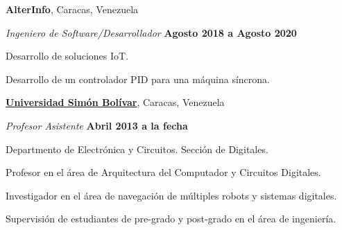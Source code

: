 \documentclass[10pt]{article}
\begin{document}
\textbf{AlterInfo}, Caracas, Venezuela
\begin{outerlist}
    \item[] \textit{Ingeniero de Software/Desarrollador}%
            \hfill \textbf{Agosto 2018 a Agosto 2020}
            \begin{innerlist}
                \item Desarrollo de soluciones IoT.
                \item Desarrollo de un controlador PID para una máquina síncrona.
            \end{innerlist}
\end{outerlist}

\href{http://www.usb.ve/}{\textbf{Universidad Simón Bolívar}}, Caracas, Venezuela
\begin{outerlist}
    \item[] \textit{Profesor Asistente}%
            \hfill \textbf{Abril 2013 a la fecha}
            \begin{innerlist}
                \item Departmento de Electrónica y Circuitos. Sección de Digitales.
                \item Profesor en el área de Arquitectura del Computador y Circuitos Digitales.
                \item Investigador en el área de navegación de múltiples robots
                  y sistemas digitales.
                \item Supervisión de estudiantes de pre-grado y post-grado en el área de ingeniería.
            \end{innerlist}

%
\end{outerlist}
\end{document}
